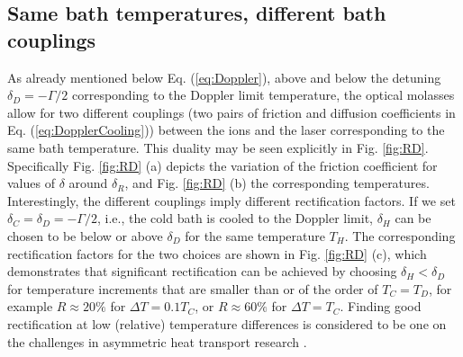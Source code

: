 \subsection{Same bath temperatures, different bath couplings\label{TC}}
%
%
As already mentioned below Eq. (\ref{eq:Doppler}), above and below the detuning  $\delta_D=-\Gamma/2$ corresponding to the  Doppler limit temperature, the optical molasses allow for
two different couplings (two pairs of friction and diffusion coefficients in Eq. (\ref{eq:DopplerCooling})) between the ions and the laser corresponding to the same bath temperature.
This duality may be seen explicitly in Fig. \ref{fig:RD}. Specifically Fig. \ref{fig:RD} (a) depicts the variation of the friction coefficient for values of $\delta$ around $\delta_R$,  and Fig. \ref{fig:RD} (b) the corresponding temperatures.
Interestingly, the different couplings imply different rectification factors.
If we set $\delta_C = \delta_D=-\Gamma / 2$,  i.e., the cold bath is cooled to the Doppler limit, $\delta_H$ can be chosen to be below or above $\delta_D$ for the same temperature $T_H$. The corresponding rectification factors for the two choices
are shown in  Fig. \ref{fig:RD} (c),
which
demonstrates that significant rectification can be achieved by choosing $\delta_H<\delta_D$ for temperature increments that
are smaller than or of the order of $T_C=T_D$, for example $R\approx 20\%$ for $\Delta T=0.1 T_C$, or $R\approx 60\%$
for $\Delta T= T_C$.  Finding good rectification at low (relative) temperature differences is considered to be one on the challenges
in asymmetric heat transport research \cite{Zhang2015}.


